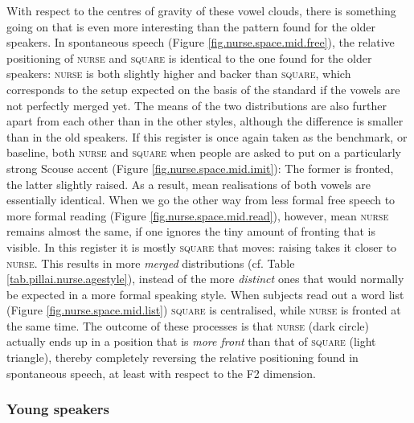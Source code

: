 With respect to the centres of gravity of these vowel clouds, there is something going on that is even more interesting than the pattern found for the older speakers.
In spontaneous speech (Figure \ref{fig.nurse.space.mid.free}), the relative positioning of \textsc{nurse} and \textsc{square} is identical to the one found for the older speakers: \textsc{nurse} is both slightly higher and backer than \textsc{square}, which corresponds to the setup expected on the basis of the standard if the vowels are not perfectly merged yet.
The means of the two distributions are also further apart from each other than in the other styles, although the difference is smaller than in the old speakers.
If this register is once again taken as the benchmark, or baseline, both \textsc{nurse} and \textsc{square}  when people are asked to put on a particularly strong Scouse accent (Figure \ref{fig.nurse.space.mid.imit}): The former is fronted, the latter slightly raised.
As a result, mean realisations of both vowels are essentially identical.
When we go the other way from less formal free speech to more formal reading (Figure \ref{fig.nurse.space.mid.read}), however, mean \textsc{nurse} remains almost the same, if one ignores the tiny amount of fronting that is visible.
In this register it is mostly \textsc{square} that moves: raising takes it closer to \textsc{nurse}.
This results in more \emph{merged} distributions (cf. Table \ref{tab.pillai.nurse.agestyle}), instead of the more \emph{distinct} ones that would normally be expected in a more formal speaking style.
When subjects read out a word list (Figure \ref{fig.nurse.space.mid.list}) \textsc{square} is centralised, while \textsc{nurse} is fronted at the same time.
The outcome of these processes is that \textsc{nurse} (dark circle) actually ends up in a position that is \emph{more front} than that of \textsc{square} (light triangle), thereby completely reversing the relative positioning found in spontaneous speech, at least with respect to the F2 dimension.

\subsubsection{Young speakers}

